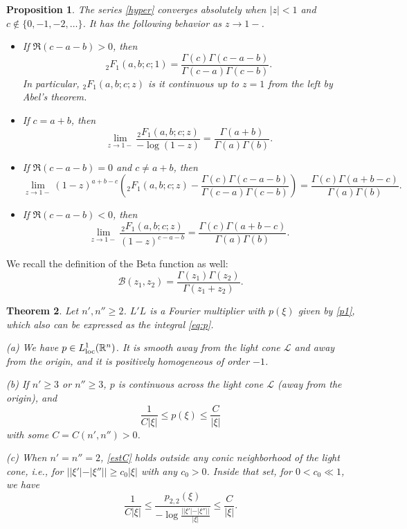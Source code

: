 \documentclass[11pt]{amsart}
\newtheorem{theorem}{Theorem}[section]
\newtheorem{proposition}[theorem]{Proposition}
\theoremstyle{definition}
\theoremstyle{remark}
\numberwithin{equation}{section}
\newcommand{\rb}{\mathbb{R}}
\begin{document}
\begin{proposition}\label{pr_H}\cite{Andrews-SF}
	The series \eqref{hyper} converges absolutely when $|z|<1$ and $c\not\in \{0,-1,-2,\dots\}$. It	has the following behavior  as $z\to 1-$.
	\begin{itemize}
		\item[(a)] If $\Re(c-a-b) > 0$, then 
		\[
		{}_2F_1(a,b;c;1) = \frac{\Gamma(c) \Gamma(c-a-b)}{\Gamma(c-a) \Gamma(c-b)}.
		\]
		In particular, ${}_2F_1(a,b;c;z)$ is it continuous up to $z=1$ from the left by Abel's theorem.  
		\item[(b)] If $c=a+b$, then 
		\[
		\lim_{z \to 1-} \frac{{}_2F_1(a,b;c;z)}{-\log(1-z)} = \frac{\Gamma(a+b)}{\Gamma(a) \Gamma(b)}.
		\]
		\item[(c)] If $\Re(c-a-b) = 0$ and $c \neq a+b$, then 
		\[
		\lim_{z \to 1-} (1-z)^{a+b-c} \left( {}_2F_1(a,b;c;z) - \frac{\Gamma(c) \Gamma(c-a-b)}{\Gamma(c-a) \Gamma(c-b)} \right) = \frac{\Gamma(c) \Gamma(a+b-c)}{\Gamma(a) \Gamma(b)}.
		\]
		\item[(d)] If $\Re(c-a-b) < 0$, then
		\[
		\lim_{z \to 1-} \frac{{}_2F_1(a,b;c;z)}{(1-z)^{c-a-b}} = \frac{\Gamma(c) \Gamma(a+b-c)}{\Gamma(a) \Gamma(b)}.
		\]
	\end{itemize}
\end{proposition}
 

We recall the definition of the Beta function as well:
\[
\mathcal{B}(z_1,z_2) = \frac{\Gamma(z_1) \Gamma(z_2)}{\Gamma(z_1+z_2)}.
\]
 

\begin{theorem}   \label{thm_p}
	Let $n', n'' \geq 2$. $L'L$ is a Fourier multiplier with $p(\xi)$ given by \eqref{p1}, which also can be expressed as the integral \eqref{eq:p}. 

	(a) We have $p\in L^1_{\rm loc}(\rb^n)$. It is smooth away from the light cone $\mathcal L$ and away from the origin, and it is positively homogeneous of order $-1$. 
	
	(b) If $n'\ge3$ or $n''\ge3$, $p$ is continuous across the light cone $\mathcal L$ (away from the origin), and 
	\begin{equation}   \label{estC}
\frac{1}{C|\xi|}\le	p(\xi)\le \frac{C}{|\xi|}
	\end{equation}
with some $C=C(n',n'')>0$.

(c) When $n'=n''=2$, \eqref{estC} holds outside any conic neighborhood of the light cone, i.e., for $| |\xi'|-|\xi''||\ge c_0|\xi|$ with any $c_0>0$. Inside that set, for $0<c_0\ll1$, we have
\begin{equation}   \label{est_C}
\frac{1}{C|\xi|}\le	\frac{p_{2,2}(\xi)}{-\log \frac{| |\xi'|-|\xi''||}{|\xi|} }\le \frac{C}{|\xi|}.
\end{equation}
\end{theorem}
\end{document}
